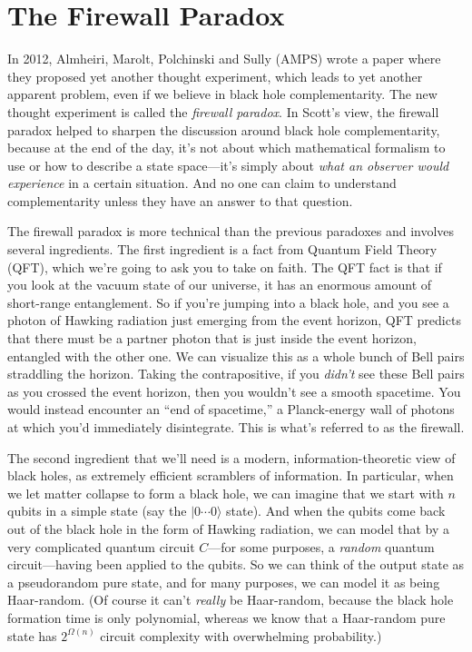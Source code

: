 \documentclass[12pt]{report}
\theoremstyle{plain}
\theoremstyle{definition}
\renewcommand{\ket}[1]{|#1\rangle}
\begin{document}
\section{The Firewall Paradox}

In 2012, Almheiri, Marolt, Polchinski and Sully (AMPS) wrote a paper \cite{amps} where they proposed yet another thought experiment,
which leads to yet another apparent problem, even if we believe in black hole complementarity.  The new thought experiment is called
the {\em firewall paradox}.  In Scott's view, the firewall paradox helped to sharpen the discussion around black hole complementarity, because
at the end of the day, it's not about which mathematical formalism to use or how to describe a state space---it's simply about {\em what an observer would experience} in a certain situation.  And no one can claim to understand complementarity unless they have an answer to that question.

The firewall paradox is more technical than the previous paradoxes
and involves several ingredients.
The first ingredient is a fact from Quantum Field Theory (QFT), which we're going to ask you to take on faith.
The QFT fact is that if you look at the vacuum state of our universe,
it has an enormous amount of short-range entanglement.
So if you're jumping into a black hole, and you see a photon of Hawking radiation
just emerging from the event horizon,
QFT predicts that there must be a partner photon that is just inside the event horizon,
entangled with the other one.
We can visualize this as a whole bunch of Bell pairs straddling the horizon.
Taking the contrapositive, if you {\em didn't} see these Bell pairs
as you crossed the event horizon, then you wouldn't see a smooth spacetime.
You would instead encounter an ``end of spacetime,'' a Planck-energy wall of photons at which
you'd immediately disintegrate.  This is what's referred to as the firewall.

The second ingredient that we'll need is a modern, information-theoretic view of
black holes, as extremely efficient scramblers of information.
In particular, when we let matter collapse to form a black hole, we can imagine that we start with $n$ qubits
in a simple state (say the $\ket{0\cdots 0}$ state).
And when the qubits come back out of the black hole
in the form of Hawking radiation,
we can model that by a very complicated quantum circuit $C$---for some purposes, a {\em random} quantum circuit---having been applied to
the qubits.
So we can think of the output state as a pseudorandom pure state,
and for many purposes, we can model it as being Haar-random.
(Of course it can't {\em really} be Haar-random, because the black hole formation time is only polynomial,
whereas we know that a Haar-random pure state has $2^{\Omega(n)}$ circuit complexity
with overwhelming probability.)
\end{document}
